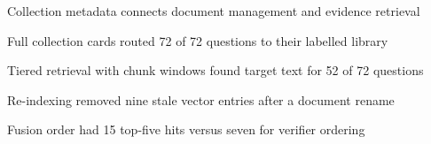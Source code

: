 \begin{highlights}
\item Collection metadata connects document management and evidence retrieval
\item Full collection cards routed 72 of 72 questions to their labelled library
\item Tiered retrieval with chunk windows found target text for 52 of 72 questions
\item Re-indexing removed nine stale vector entries after a document rename
\item Fusion order had 15 top-five hits versus seven for verifier ordering
\end{highlights}
